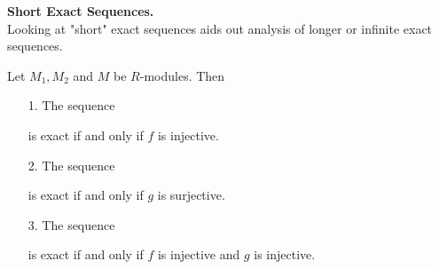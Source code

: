 \documentclass[12pt,letterpaper]{algebra_book}
\newcommand{\smallish}{1.45em} %
\theoremstyle{definition}
\begin{document}
\noindent \textbf{Short Exact Sequences.}\\
Looking at "short" exact sequences aids out analysis of longer or
infinite exact sequences. 
\begin{proposition}
    Let $M_1, M_2$ and $M$ be $R$-modules. Then
    \begin{itemize}
        \item[1.] The sequence
        is exact if and only if $f$ is injective.

        \item[2.] The sequence
        is exact if and only if $g$ is surjective. 

        \item[3.] 
        The sequence
         is exact if and only if $f$ is injective
            and $g$ is injective.
    \end{itemize}
\end{proposition}
\end{document}
